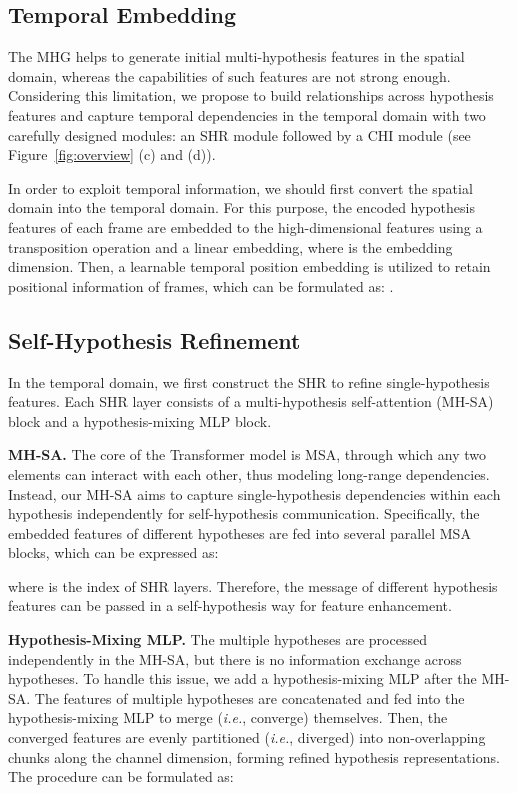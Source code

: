 \documentclass[10pt,twocolumn,letterpaper]{article}
\begin{document}
\subsection{Temporal Embedding}
The MHG helps to generate initial multi-hypothesis features in the spatial domain, whereas the capabilities of such features are not strong enough. 
Considering this limitation, we propose to build relationships across hypothesis features and capture temporal dependencies in the temporal domain with two carefully designed modules: an SHR module followed by a CHI module (see Figure~\ref{fig:overview} (c) and (d)). 

In order to exploit temporal information, we should first convert the spatial domain into the temporal domain. 
For this purpose, the encoded hypothesis features  of each frame are embedded to the high-dimensional features  using a transposition operation and a linear embedding, where  is the embedding dimension. 
Then, a learnable temporal position embedding  is utilized to retain positional information of frames, which can be formulated as: . 

\subsection{Self-Hypothesis Refinement}
In the temporal domain, we first construct the SHR to refine single-hypothesis features. 
Each SHR layer consists of a multi-hypothesis self-attention (MH-SA) block and a hypothesis-mixing MLP block. 

\noindent \textbf{MH-SA.}
The core of the Transformer model is MSA, through which any two elements can interact with each other, thus modeling long-range dependencies. 
Instead, our MH-SA aims to capture single-hypothesis dependencies within each hypothesis independently for self-hypothesis communication. 
Specifically, the embedded features  of different hypotheses are fed into several parallel MSA blocks, which can be expressed as:

where  is the index of SHR layers. 
Therefore, the message of different hypothesis features can be passed in a self-hypothesis way for feature enhancement. 

\noindent \textbf{Hypothesis-Mixing MLP.}
The multiple hypotheses are processed independently in the MH-SA, but there is no information exchange across hypotheses. 
To handle this issue, we add a hypothesis-mixing MLP after the MH-SA.
The features of multiple hypotheses are concatenated and fed into the hypothesis-mixing MLP to merge (\emph{i.e.}, converge) themselves. 
Then, the converged features are evenly partitioned (\emph{i.e.}, diverged) into non-overlapping chunks along the channel dimension, forming refined hypothesis representations. 
The procedure can be formulated as:
\end{document}
